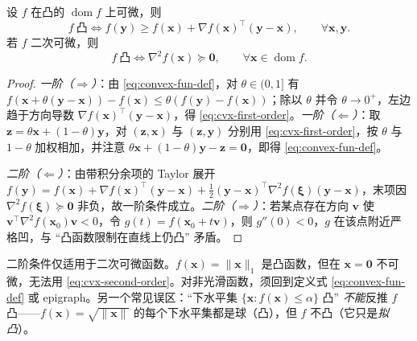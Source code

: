 \begin{theorem}[一阶与二阶判据]\label{thm:cvx-criteria}
设 $f$ 在凸的 $\operatorname{dom}f$ 上可微，则
\begin{equation}
  f\ \text{凸}\iff f(\mathbf y)\ge f(\mathbf x)+\nabla f(\mathbf x)^\top(\mathbf y-\mathbf x),\qquad\forall\mathbf x,\mathbf y.
  \label{eq:cvx-first-order}
\end{equation}
若 $f$ 二次可微，则
\begin{equation}
  f\ \text{凸}\iff\nabla^2 f(\mathbf x)\succeq\mathbf 0,\qquad\forall\mathbf x\in\operatorname{dom}f.
  \label{eq:cvx-second-order}
\end{equation}
\end{theorem}
\begin{proof}
\emph{一阶（$\Rightarrow$）}：由 \cref{eq:convex-fun-def}，对 $\theta\in(0,1]$ 有 $f(\mathbf x+\theta(\mathbf y-\mathbf x))-f(\mathbf x)\le\theta(f(\mathbf y)-f(\mathbf x))$；除以 $\theta$ 并令 $\theta\to0^+$，左边趋于方向导数 $\nabla f(\mathbf x)^\top(\mathbf y-\mathbf x)$，得 \cref{eq:cvx-first-order}。\emph{一阶（$\Leftarrow$）}：取 $\mathbf z=\theta\mathbf x+(1-\theta)\mathbf y$，对 $(\mathbf z,\mathbf x)$ 与 $(\mathbf z,\mathbf y)$ 分别用 \cref{eq:cvx-first-order}，按 $\theta$ 与 $1-\theta$ 加权相加，并注意 $\theta\mathbf x+(1-\theta)\mathbf y-\mathbf z=\mathbf 0$，即得 \cref{eq:convex-fun-def}。

\emph{二阶（$\Leftarrow$）}：由带积分余项的 Taylor 展开 $f(\mathbf y)=f(\mathbf x)+\nabla f(\mathbf x)^\top(\mathbf y-\mathbf x)+\tfrac12(\mathbf y-\mathbf x)^\top\nabla^2 f(\boldsymbol\xi)(\mathbf y-\mathbf x)$，末项因 $\nabla^2 f(\boldsymbol\xi)\succeq\mathbf 0$ 非负，故一阶条件成立。\emph{二阶（$\Rightarrow$）}：若某点存在方向 $\mathbf v$ 使 $\mathbf v^\top\nabla^2 f(\mathbf x_0)\mathbf v<0$，令 $g(t)=f(\mathbf x_0+t\mathbf v)$，则 $g''(0)<0$，$g$ 在该点附近严格凹，与 “凸函数限制在直线上仍凸” 矛盾。
\end{proof}

\begin{pitfall}
二阶条件仅适用于二次可微函数。$f(\mathbf x)=\|\mathbf x\|_1$ 是凸函数，但在 $\mathbf x=\mathbf 0$ 不可微，无法用 \cref{eq:cvx-second-order}。对非光滑函数，须回到定义式 \cref{eq:convex-fun-def} 或 epigraph。另一个常见误区：“下水平集 $\{\mathbf x:f(\mathbf x)\le\alpha\}$ 凸” \emph{不能}反推 $f$ 凸——$f(\mathbf x)=\sqrt{\|\mathbf x\|}$ 的每个下水平集都是球（凸），但 $f$ 不凸（它只是\emph{拟凸}）。
\end{pitfall}

